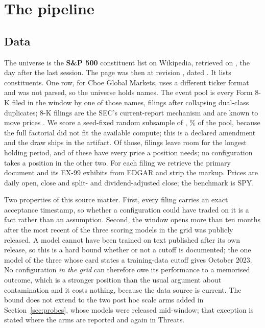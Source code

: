 \documentclass[sigconf]{acmart}
\begin{document}
\begin{table}[t]
\centering
\caption{What \NumCodedTotal{} recent LLM trading pipelines report. \checkmark{} means a sentence
stating the item was located in the paper's full text; a blank means it was not. \emph{Sensitivity}
means a robustness analysis over implementation choices; $\dagger$ marks a paper that ablates
\emph{components} instead, which is a different thing and is why the text says no paper we could
code reports the former.}
\label{tab:coding}
\small

\end{table}

\section{The pipeline}
\label{sec:pipeline}

\subsection{Data}

The universe is the \textbf{S\&P 500} constituent list on Wikipedia, retrieved on \MemFetched{}, the
day after the last session. The page was then at revision \MemRevision{}, dated \MemRevisionDate{}.
It lists \MemListed{} constituents. One row, for Cboe Global Markets, uses a different ticker format
and was not parsed, so the universe holds \MemConstituents{} names. The event pool is every
Form 8-K filed in the window by one of those names, \NumEventsAvailable{} filings after collapsing
dual-class duplicates; 8-K filings are the SEC's current-report mechanism and are known to move
prices \cite{lerman2010new}. We score a seed-fixed random subsample of \NumEventsSampled{},
\SamplePct{}\% of the pool, because the full factorial did not fit the available compute; this is a
declared amendment and the draw ships in the artifact. Of those, \NumEvents{} filings leave room for
the longest holding period, and \NumPriceOK{} of these have every price a position needs; no
configuration takes a position in the other two. For each filing we
retrieve the primary document and its EX-99 exhibits from EDGAR and strip the markup. Prices are
daily open, close and split- and dividend-adjusted close; the benchmark is SPY.

Two properties of this source matter. First, every filing carries an exact acceptance timestamp, so
whether a configuration could have traded on it is a fact rather than an assumption. Second, the
window opens more than ten months after the most recent of the three scoring models in the grid was
publicly released. A model cannot have been trained on text published after its own release, so this
is a hard bound whether or not a cutoff is documented; the one model of the three whose card states
a training-data cutoff gives October 2023. No configuration \emph{in the grid} can therefore owe its
performance to a memorised outcome, which is a stronger position than the usual argument about
contamination \cite{glasserman2023assessing} and it costs nothing, because the data source is
current. The bound does not extend to the two post hoc scale arms added in Section~\ref{sec:probes},
whose models were released mid-window; that exception is stated where the arms are reported and
again in Threats.
\end{document}
